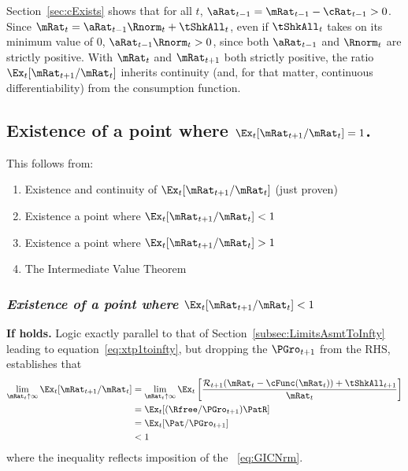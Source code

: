 \documentclass[\econtexRoot/BufferStockTheory]{subfiles}
\begin{document}
Section~\ref{sec:cExists} shows that for all $t$, $\aRat_{t-1} = {\mRat}_{t-1} -  \cRat_{t-1} > 0$.  Since ${\mRat}_{t}= {\aRat}_{t-1} \Rnorm_{t} + \tShkAll_{t}$, even if $\tShkAll_{t}$ takes on its minimum value of 0, $\aRat_{t-1} \Rnorm_{t} > 0$, since both $\aRat_{t-1}$ and $\Rnorm_{t}$ are strictly positive.  With $\mRat_{t}$ and $\mRat_{t+1}$ both strictly positive, the ratio $\Ex_t [{\mRat}_{t+1}/\mRat_t]$ inherits continuity (and, for that matter, continuous differentiability) from the consumption function.

\subsection{Existence of a point where
  \texorpdfstring{$\Ex_t [{\mRat}_{t+1}/\mRat_t]=1$}
  {Ex-t[mRat-{t+1}/mRat-{t}]=1}.}

This follows from:
\begin{enumerate}
\item Existence and continuity of $\Ex_t [{\mRat}_{t+1}/\mRat_t]$ (just proven)
  \item Existence a point where $\Ex_t [{\mRat}_{t+1}/\mRat_t] < 1$
  \item Existence a point where $\Ex_t [{\mRat}_{t+1}/\mRat_t] > 1$
    \item The Intermediate Value Theorem
    \end{enumerate}

\subsubsection{\textit{Existence of a point where $\Ex_t [{\mRat}_{t+1}/\mRat_t] < 1$}}
    
\textbf{If {\RIC} holds.}  Logic exactly parallel to that of Section~\ref{subsec:LimitsAsmtToInfty} leading to equation~\eqref{eq:xtp1toinfty}, but dropping the $\PGro_{t+1}$ from the RHS, establishes that
\begin{align}
  \lim_{\mRat_{t} \uparrow \infty} \Ex_{t}[{\mRat}_{t+1}/\mRat_{t}]  & =   
                                                                       \lim_{\mRat_{t} \uparrow \infty} 
                                                                       \Ex_{t}\left[\frac{{\mathcal{\mathcal{R}}}_{t+1}(\mRat_{t}-\cFunc(\mRat_{t}))+{\tShkAll}_{t+1}}{\mRat_{t}}\right] \notag 
  \\  & = \Ex_{t}[(\Rfree/{\PGro}_{t+1})\PatR]  \notag
  \\  & = \Ex_{t}[{\Pat}/{\PGro}_{t+1}]  \label{eq:emgro}
  \\  & < 1 \notag
\end{align}
where the inequality reflects imposition of the \GICNrm~\eqref{eq:GICNrm}.
\end{document}
